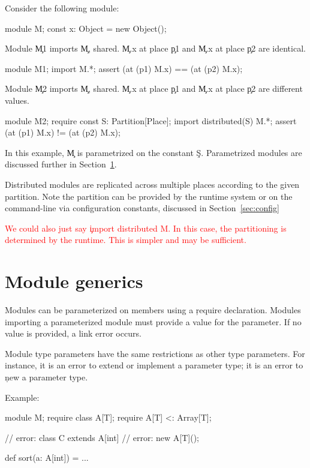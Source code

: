 \documentclass{article}
\newcommand\Secref[1]{Section~\ref{sec:#1}}
\newcommand\RED[1]{\textcolor{red}{#1}}
\newcommand\TODO[1]{\RED{#1}}
\begin{document}
Consider the following module:
\begin{xten}
module M;
const x: Object = new Object();
\end{xten}

Module \c{M1} imports \c{M}, shared.
\c{M.x} at place \c{p1}
and
\c{M.x} at place \c{p2}
are identical.
\begin{xten}
module M1;
import M.*;
assert (at (p1) M.x) == (at (p2) M.x);
\end{xten}

Module \c{M2} imports \c{M}, shared.
\c{M.x} at place \c{p1}
and
\c{M.x} at place \c{p2}
are different values.
\begin{xten}
module M2;
require const S: Partition[Place];
import distributed(S) M.*;
assert (at (p1) M.x) != (at (p2) M.x);
\end{xten}

In this example, \c{M} is parametrized on the constant \c{S}.
Parametrized modules are discussed further in \Secref{generics}.

Distributed modules are replicated across multiple places
according to the given partition.   Note the partition
can be provided by the runtime system or on the command-line via
configuration constants, discussed in \Secref{config}  

\TODO{We could also just say \c{import distributed M}.  In this
case, the partitioning is determined by the runtime.  This is
simpler and may be sufficient.}

\section{Module generics}
\label{sec:generics}

Modules can be parameterized on members using a \c{require}
declaration.  Modules importing a parameterized module must
provide a value for the parameter.  If no value is provided, a
link error occurs.

Module type parameters have the same restrictions as other type
parameters.  For instance,
it is an error to extend or implement a parameter type;
it is an error to \c{new} a parameter type.

Example:

\begin{xten}
module M;
require class A[T];
require A[T] <: Array[T];

// error: class C extends A[int] { }
// error: new A[T]();

def sort(a: A[int]) = ...
\end{xten}
\end{document}
